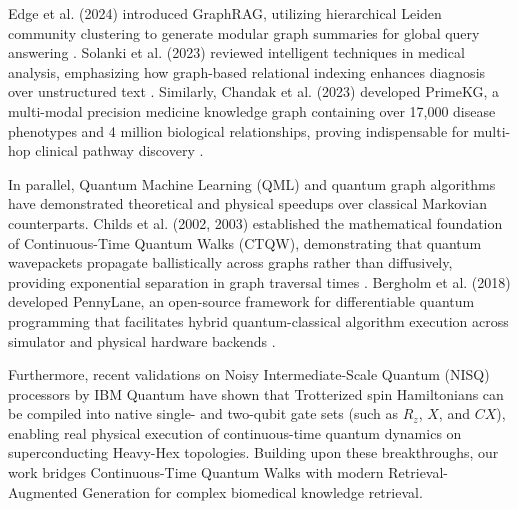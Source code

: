 \documentclass[11pt,a4paper]{article}
\begin{document}
Edge et al. (2024) introduced GraphRAG, utilizing hierarchical Leiden community clustering to generate modular graph summaries for global query answering \cite{edge2024graphrag}. Solanki et al. (2023) reviewed intelligent techniques in medical analysis, emphasizing how graph-based relational indexing enhances diagnosis over unstructured text \cite{solanki2023}. Similarly, Chandak et al. (2023) developed PrimeKG, a multi-modal precision medicine knowledge graph containing over 17,000 disease phenotypes and 4 million biological relationships, proving indispensable for multi-hop clinical pathway discovery \cite{chandak2023building}.

In parallel, Quantum Machine Learning (QML) and quantum graph algorithms have demonstrated theoretical and physical speedups over classical Markovian counterparts. Childs et al. (2002, 2003) established the mathematical foundation of Continuous-Time Quantum Walks (CTQW), demonstrating that quantum wavepackets propagate ballistically across graphs rather than diffusively, providing exponential separation in graph traversal times \cite{childs2002continuous, childs2003exponential}. Bergholm et al. (2018) developed PennyLane, an open-source framework for differentiable quantum programming that facilitates hybrid quantum-classical algorithm execution across simulator and physical hardware backends \cite{bergholm2018pennylane}.

Furthermore, recent validations on Noisy Intermediate-Scale Quantum (NISQ) processors by IBM Quantum have shown that Trotterized spin Hamiltonians can be compiled into native single- and two-qubit gate sets (such as $R_z$, $X$, and $CX$), enabling real physical execution of continuous-time quantum dynamics on superconducting Heavy-Hex topologies. Building upon these breakthroughs, our work bridges Continuous-Time Quantum Walks with modern Retrieval-Augmented Generation for complex biomedical knowledge retrieval.
\end{document}
